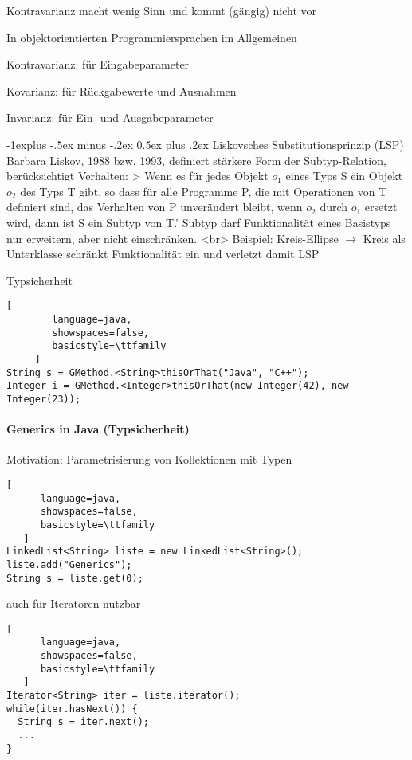 \documentclass[10pt]{article}
\makeatletter
\renewcommand{\subsection}{\@startsection{subsection}{2}{0mm}%
                                {-1explus -.5ex minus -.2ex}%
                                {0.5ex plus .2ex}%
                                {\normalfont\normalsize\bfseries}}
\makeatother
\begin{document}
\begin{itemize*}
Kontravarianz macht wenig Sinn und kommt (gängig) nicht vor

In objektorientierten Programmiersprachen im Allgemeinen
\begin{itemize*}
  \item Kontravarianz: für Eingabeparameter
  \item Kovarianz: für Rückgabewerte und Ausnahmen
  \item Invarianz: für Ein- und Ausgabeparameter
\end{itemize*}

\subsection{Liskovsches Substitutionsprinzip (LSP)}
Barbara Liskov, 1988 bzw. 1993, definiert stärkere Form der Subtyp-Relation, berücksichtigt Verhalten:
> Wenn es für jedes Objekt $o_1$ eines Typs S ein Objekt $o_2$ des Typs T gibt, so dass für alle Programme P, die mit Operationen von T definiert sind, das Verhalten von P unverändert bleibt, wenn $o_2$ durch $o_1$ ersetzt wird, dann ist S ein Subtyp von T.'
Subtyp darf Funktionalität eines Basistyps nur erweitern, aber nicht einschränken. <br>
Beispiel: Kreis-Ellipse $\rightarrow$ Kreis als Unterklasse schränkt Funktionalität ein und verletzt damit LSP

Typsicherheit
\begin{lstlisting}[
        language=java,
        showspaces=false,
        basicstyle=\ttfamily
     ]
String s = GMethod.<String>thisOrThat("Java", "C++");
Integer i = GMethod.<Integer>thisOrThat(new Integer(42), new Integer(23));
\end{lstlisting}


\paragraph{Generics in Java (Typsicherheit)}
Motivation: Parametrisierung von Kollektionen mit Typen
\begin{lstlisting}[
      language=java,
      showspaces=false,
      basicstyle=\ttfamily
   ]
LinkedList<String> liste = new LinkedList<String>();
liste.add("Generics");
String s = liste.get(0);
\end{lstlisting}

auch für Iteratoren nutzbar
\begin{lstlisting}[
      language=java,
      showspaces=false,
      basicstyle=\ttfamily
   ]
Iterator<String> iter = liste.iterator();
while(iter.hasNext()) {
  String s = iter.next();
  ...
}
\end{lstlisting}


\end{itemize*}
\end{document}

